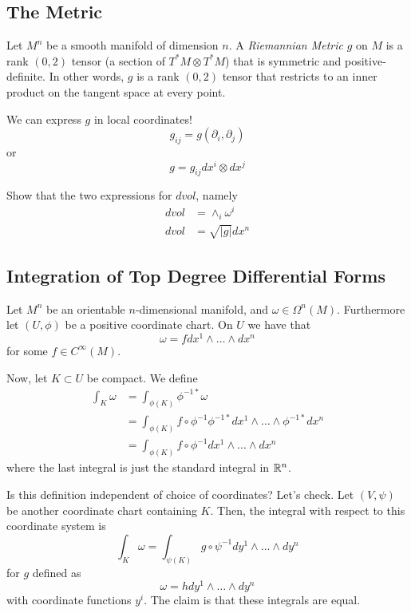 \documentclass[../main.tex]{subfiles}
\begin{document}
\subsection{The Metric}

\begin{defn}
    Let $M^n$ be a smooth manifold of dimension $n$. A {\em Riemannian Metric}
    $g$ on $M$ is a rank $(0,2)$ tensor (a section of $T^*M\otimes T^*M$) that
    is symmetric and positive-definite. In other words, $g$ is a rank $(0,2)$
    tensor that restricts to an inner product on the tangent space at every
    point.
\end{defn}

We can express $g$ in local coordinates!
\[
    g_{ij} = g(\partial_i,\partial_j)
\]
or
\[
    g = g_{ij}dx^i\otimes dx^j
\]

\begin{hw}
    Show that the two expressions for $dvol$, namely
    \[
        \begin{aligned}
            dvol &= \wedge_i\omega^i\\
            dvol &= \sqrt{|g|}dx^n
        \end{aligned}
    \]
\end{hw}

\subsection{Integration of Top Degree Differential Forms}
Let $M^n$ be an orientable $n$-dimensional manifold, and $\omega\in
\Omega^n(M)$. Furthermore let $(U,\phi)$ be a positive coordinate chart. On $U$
we have that
\[
    \omega = fdx^1\wedge\ldots\wedge dx^n
\]
for some $f\in C^{\infty}(M)$.

Now, let $K\subset U$ be compact. We define
\[
    \begin{aligned}
        \int_K\omega &= \int_{\phi(K)}\phi^{-1*}\omega\\
                    &= \int_{\phi(K)}f\circ\phi^{-1}
                    \phi^{-1*}dx^1\wedge\ldots\wedge\phi^{-1*}dx^n\\
                    &=\int_{\phi(K)}f\circ\phi^{-1}dx^1\wedge\ldots\wedge dx^n
    \end{aligned}
\]
where the last integral is just the standard integral in $\mathbb{R}^n$.

Is this definition independent of choice of coordinates? Let's check.
Let $(V,\psi)$ be another coordinate chart containing $K$. Then, the integral
with respect to this coordinate system is
\[
    \int_K\omega = \int_{\psi(K)}g\circ\psi^{-1}dy^1\wedge\ldots\wedge dy^n
\]
for $g$ defined as
\[
    \omega = hdy^1\wedge\ldots\wedge dy^n
\]
with coordinate functions $y^i$. The claim is that these integrals are equal.
\end{document}
